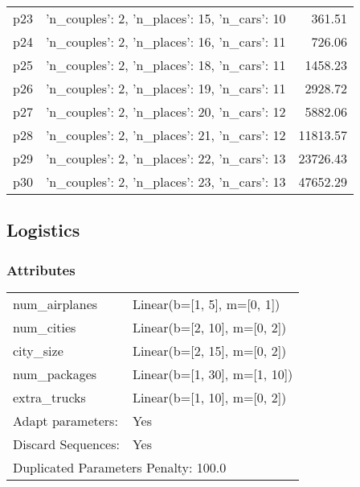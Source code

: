 \documentclass{article}
\begin{document}
\begin{center}
\begin{tabular}{@{}l|r|r@{}}
  p23&{'n\_couples': 2, 'n\_places': 15, 'n\_cars': 10}&361.51\\
  p24&{'n\_couples': 2, 'n\_places': 16, 'n\_cars': 11}&726.06\\
  p25&{'n\_couples': 2, 'n\_places': 18, 'n\_cars': 11}&1458.23\\
  p26&{'n\_couples': 2, 'n\_places': 19, 'n\_cars': 11}&2928.72\\
  p27&{'n\_couples': 2, 'n\_places': 20, 'n\_cars': 12}&5882.06\\
  p28&{'n\_couples': 2, 'n\_places': 21, 'n\_cars': 12}&11813.57\\
  p29&{'n\_couples': 2, 'n\_places': 22, 'n\_cars': 13}&23726.43\\
  p30&{'n\_couples': 2, 'n\_places': 23, 'n\_cars': 13}&47652.29
                            \end{tabular}
                            \end{center}
                    
                            \newpage \subsection{Logistics}
                    \subsubsection*{Attributes}
                    \begin{tabular}{@{}p{}p{}@{}}
                    \toprule
                    num\_airplanes & Linear(b=[1, 5], m=[0, 1])\\
num\_cities & Linear(b=[2, 10], m=[0, 2])\\
city\_size & Linear(b=[2, 15], m=[0, 2])\\
num\_packages & Linear(b=[1, 30], m=[1, 10])\\
extra\_trucks & Linear(b=[1, 10], m=[0, 2])
                    \\\midrule
                    Adapt parameters: & Yes
                                \\\midrule
                                Discard Sequences: & Yes \\
                    \bottomrule
                    \multicolumn{2}{l}{Duplicated Parameters Penalty: 100.0}
                    \end{tabular}
                
\end{document}
